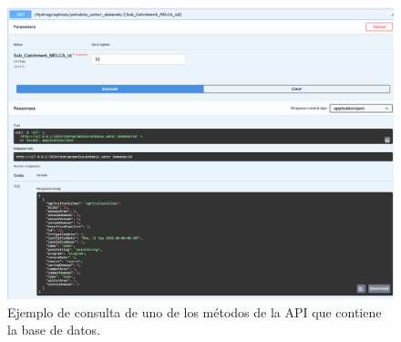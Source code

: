   \begin{figure}[h!]
    \begin{center}
      \includegraphics[height=4.in]{Figures/potable water demands.PNG}
      \caption{ Ejemplo de consulta de uno de los métodos de la API que contiene la base de datos. }
      \label{BD}
    \end{center}
  \end{figure}

  

